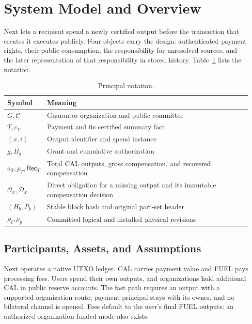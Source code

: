\section{System Model and Overview}
\label{sec:model}


Next lets a recipient spend a newly certified output before the transaction that creates it executes publicly. Four objects carry the design: authenticated payment rights, their public consumption, the responsibility for unresolved sources, and the later representation of that responsibility in stored history. Table~\ref{tab:model-notation} lists the notation.

\begin{table}[!b]
\caption{Principal notation.}
\label{tab:model-notation}
\centering
\begin{tabular}{@{}p{}p{}@{}}
\toprule
Symbol & Meaning \\
\midrule
$G,\mathcal C$ & Guarantor organization and public committee \\
$T,c_T$ & Payment and its certified summary fact \\
$(x,i)$ & Output identifier and spend instance \\
$g,B_g$ & Grant and cumulative authorization \\
$a_T,p_T,\mathsf{Rec}_T$ & Total CAL outputs, gross compensation, and recovered compensation \\
$\mathcal O_x,\mathcal D_x$ & Direct obligation for a missing output and its immutable compensation decision \\
$(H_b,P_b)$ & Stable block hash and original part-set header \\
$\rho_\ell,\rho_p$ & Committed logical and installed physical revisions \\
\bottomrule
\end{tabular}
\end{table}

\subsection{Participants, Assets, and Assumptions}
\label{sec:model-participants}
Next operates a native UTXO ledger. CAL carries payment value and FUEL pays processing fees. Users spend their own outputs, and organizations hold additional CAL in public reserve accounts. The fast path requires an output with a supported organization route; payment principal stays with its owner, and no bilateral channel is opened. Fees default to the user's final FUEL outputs; an authorized organization-funded mode also exists.

